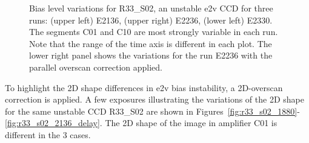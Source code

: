 \begin{figure}[htbp]
\begin{minipage}[b]{0.45\textwidth}
\end{minipage}
\caption{Bias level variations for R33\_S02, an unstable e2v CCD for three runs:  (upper left) E2136, (upper right) E2236, (lower left) E2330.  The segments C01 and C10 are most strongly variable in each run.  Note that the range of the time axis is different in each plot. The lower right panel shows the variations for the run E2236 with the parallel overscan correction applied.}
\label{fig:r33_s02_bias}
\end{figure}

%
%

To highlight the 2D shape differences in e2v bias instability, a 2D-overscan correction
is applied. A few exposures illustrating the variations of the 2D shape
for the same unstable CCD R33\_S02 are shown in Figures~\ref{fig:r33_s02_1880}-\ref{fig:r33_s02_2136_delay}. The 2D shape of the image in
amplifier C01 is different in the 3 cases.

